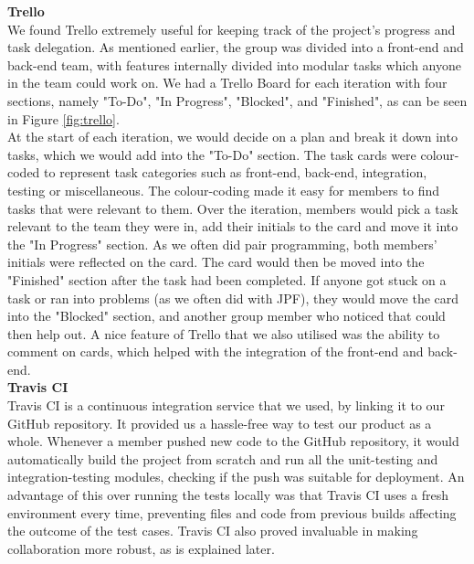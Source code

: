 \documentclass[titlepage,11pt]{article}
\begin{document}
\textbf{Trello} \\

We found Trello \cite{trello} extremely useful for keeping track of the project's progress and task delegation. As mentioned earlier, the group was divided into a front-end and back-end team, with features internally divided into modular tasks which anyone in the team could work on. We had a Trello Board for each iteration with four sections, namely "To-Do", "In Progress", "Blocked", and "Finished", as can be seen in Figure \ref{fig:trello}. \\

At the start of each iteration, we would decide on a plan and break it down into tasks, which we would add into the "To-Do" section. The task cards were colour-coded to represent task categories such as front-end, back-end, integration, testing or miscellaneous. The colour-coding made it easy for members to find tasks that were relevant to them. Over the iteration, members would pick a task relevant to the team they were in, add their initials to the card and move it into the "In Progress" section. As we often did pair programming, both members' initials were reflected on the card. The card would then be moved into the "Finished" section after the task had been completed. If anyone got stuck on a task or ran into problems (as we often did with JPF), they would move the card into the "Blocked" section, and another group member who noticed that could then help out. A nice feature of Trello that we also utilised was the ability to comment on cards, which helped with the integration of the front-end and back-end. \\

\textbf{Travis CI} \\

Travis CI \cite{travis} is a continuous integration service that we used, by linking it to our GitHub repository. It provided us a hassle-free way to test our product as a whole. Whenever a member pushed new code to the GitHub repository, it would automatically build the project from scratch and run all the unit-testing and integration-testing modules, checking if the push was suitable for deployment. An advantage of this over running the tests locally was that Travis CI uses a fresh environment every time, preventing files and code from previous builds affecting the outcome of the test cases. Travis CI also proved invaluable in making collaboration more robust, as is explained later. \\
\end{document}
